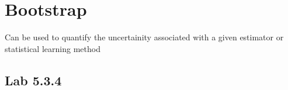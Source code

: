 \chapter{Bootstrap}
\label{chp:boots}

Can be used to quantify the uncertainity associated with a given estimator or statistical learning method

\section{Lab 5.3.4}